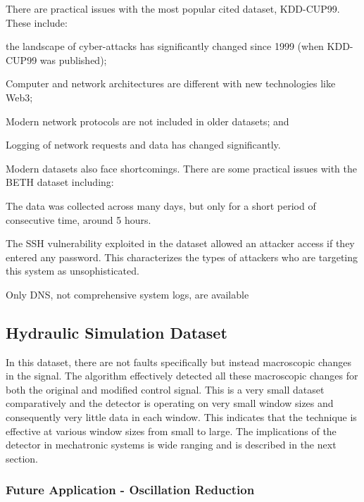 There are practical issues with the most popular cited dataset, KDD-CUP99. These include:
\begin{inlinelist}
    \item the landscape of cyber-attacks has significantly changed since 1999 (when KDD-CUP99 was published);
    \item Computer and network architectures are different with new technologies like Web3;
    \item Modern network protocols are not included in older datasets; and
    \item Logging of network requests and data has changed significantly.
\end{inlinelist}

Modern datasets also face shortcomings. There are some practical issues with the BETH dataset including:
\begin{inlinelist}
    \item The data was collected across many days, but only for a short period of consecutive time, around 5 hours.
    \item The SSH vulnerability exploited in the dataset allowed an attacker access if they entered any password. This characterizes the types of attackers who are targeting this system as unsophisticated.
    \item Only DNS, not comprehensive system logs, are available
\end{inlinelist}

\subsection{Hydraulic Simulation Dataset}

In this dataset, there are not faults specifically but instead macroscopic changes in the signal. The algorithm effectively detected all these macroscopic changes for both the original and modified control signal. This is a very small dataset comparatively and the detector is operating on very small window sizes and consequently very little data in each window. This indicates that the technique is effective at various window sizes from small to large. The implications of the detector in mechatronic systems is wide ranging and is described in the next section.


\subsubsection{Future Application - Oscillation Reduction}

